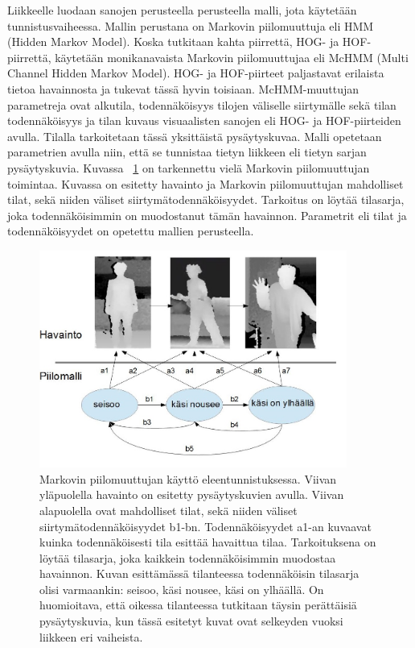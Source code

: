 Liikkeelle luodaan sanojen perusteella perusteella malli, jota käytetään tunnistusvaiheessa. Mallin perustana on Markovin piilomuuttuja
eli HMM (Hidden Markov Model). Koska tutkitaan kahta piirrettä, HOG- ja HOF-piirrettä, käytetään monikanavaista Markovin piilomuuttujaa eli McHMM (Multi Channel Hidden Markov Model). 
HOG- ja HOF-piirteet paljastavat erilaista tietoa havainnosta ja tukevat tässä hyvin toisiaan. McHMM-muuttujan parametreja ovat alkutila, 
todennäköisyys tilojen väliselle siirtymälle sekä tilan todennäköisyys ja tilan kuvaus visuaalisten sanojen eli HOG- ja HOF-piirteiden avulla. 
Tilalla tarkoitetaan tässä yksittäistä pysäytyskuvaa. Malli opetetaan parametrien avulla niin, että se tunnistaa tietyn liikkeen eli tietyn
sarjan pysäytyskuvia.\citep {6239185} Kuvassa ~\ref{fig:HMM} on tarkennettu vielä Markovin piilomuuttujan toimintaa. Kuvassa on 
esitetty havainto ja Markovin piilomuuttujan mahdolliset tilat, sekä niiden väliset siirtymätodennäköisyydet. Tarkoitus on löytää
tilasarja, joka todennäköisimmin on muodostanut tämän havainnon. Parametrit eli tilat ja todennäköisyydet on opetettu mallien perusteella. \\

\begin{figure}[htb]
  \begin{center}
    \includegraphics[width=0.9\textwidth]{HMModfcropped.jpg}
    \caption{Markovin piilomuuttujan käyttö eleentunnistuksessa. Viivan yläpuolella havainto on esitetty pysäytyskuvien avulla. Viivan alapuolella
	ovat mahdolliset tilat,	sekä niiden väliset siirtymätodennäköisyydet b1-bn. Todennäköisyydet a1-an kuvaavat kuinka todennäköisesti tila esittää havaittua tilaa.
	Tarkoituksena on löytää tilasarja, joka kaikkein todennäköisimmin muodostaa havainnon. Kuvan esittämässä tilanteessa todennäköisin tilasarja
	olisi varmaankin: seisoo, käsi nousee, käsi on ylhäällä. On huomioitava, että oikessa tilanteessa tutkitaan täysin perättäisiä pysäytyskuvia, kun
	tässä esitetyt kuvat ovat selkeyden vuoksi liikkeen eri vaiheista.}
    \label{fig:HMM}
  \end{center}
\end{figure}

